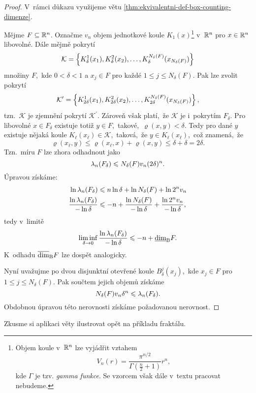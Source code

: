 \begin{proof}
    V~rámci důkazu využijeme větu \ref{thm:ekvivalentni-def-box-counting-dimenze}.

    Mějme $F\subseteq\mathbb{R}^n$. Označme $v_n$ objem jednotkové koule $K_1(x)$\footnote{Objem koule v~$\mathbb{R}^n$ lze vyjádřit vztahem
    \[V_n(r)=\dfrac{\pi^{n/2}}{\Gamma\left(\frac{n}{2}+1\right)}r^n,\]
    kde $\Gamma$ je tzv. \emph{gamma funkce}. Se vzorcem však dále v~textu pracovat nebudeme.
    } v~$\mathbb{R}^n$ pro $x\in\mathbb{R}^n$ libovolné. Dále mějmě pokrytí
    \[\mathcal{K}=\left\{K_\delta^1(x_1),K_\delta^2(x_2),\ldots,K_\delta^{N_\delta(F)}(x_{N_\delta(F)})\right\}\]
    množiny $F$,~kde $0<\delta<1$ a $x_j\in F$ pro každé $1\leqslant j\leqslant N_\delta(F)$. Pak lze zvolit pokrytí
    \[\mathcal{K}^\prime=\left\{K_{2\delta}^1(x_1),K_{2\delta}^2(x_2),\ldots,K_{2\delta}^{N_\delta(F)}(x_{N_\delta(F)})\right\},\]
    tzn.~$\mathcal{K}$ je zjemnění pokrytí $\mathcal{K}^\prime$. Zároveň však platí,~že $\mathcal{K}$ je i~pokrytím $F_\delta$. Pro libovolné $x\in F_\delta$ existuje totiž $y\in F$,~takové,~$\varrho(x,y)<\delta$. Tedy pro dané $y$ existuje nějaká koule $K_\ell(x_\ell)\in\mathcal{K}$,~taková,~že $y\in K_\ell(x_\ell)$,~což znamená,~že
    \[\varrho(x_\ell,y)\leqslant\varrho(x_\ell,x)+\varrho(x,y)\leqslant\delta+\delta=2\delta.\]
    Tzn.~míru $F$ lze zhora odhadnout jako
    \[\lambda_n(F_\delta)\leqslant N_\delta(F)v_n(2\delta)^n.\]
    Úpravou získáme:
    \begin{align*}
        \ln{\ensuremath{\lambda_n}(F_\delta)}&\leqslant n\ln{\delta}+\ln{N_\delta(F)}+\ln{2^nv_n}\\
        \dfrac{\ln{\ensuremath{\lambda_n}(F_\delta)}}{-\ln\delta}&\leqslant -n+\dfrac{\ln{N_\delta(F)}}{-\ln\delta}+\dfrac{\ln{2^nv_n}}{-\ln\delta},
    \end{align*}
    tedy v~limitě
    \[\liminf_{\delta\to 0}\dfrac{\ln\lambda_n(F_\delta)}{-\ln\delta}\leqslant -n+\underline{\dim}_\textup{B}{F}.\]
    K~odhadu $\overline{\dim}_\textup{B}{F}$ lze dospět analogicky.

    Nyní uvažujme po dvou disjunktní otevřené koule $B_\delta^j(x_j)$,~kde $x_j\in F$ pro $1\leqslant j\leqslant N_\delta(F)$. Pak součtem jejich objemů získáme
    \[N_\delta(F)v_n\delta^n\leqslant\lambda_n(F_\delta).\]
    Obdobnou úpravou této nerovnosti získáme požadovanou nerovnost.
\end{proof}
Zkusme si aplikaci věty ilustrovat opět na příkladu fraktálu.
